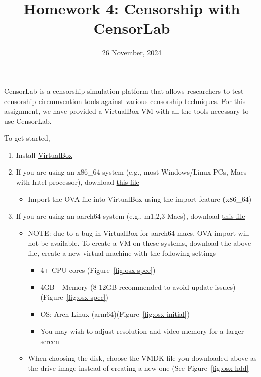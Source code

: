 \documentclass[12pt]{article}
\begin{document}
 
 
\title{Homework 4: Censorship with CensorLab}
\date{26 November, 2024}
\maketitle

CensorLab is a censorship simulation platform that allows researchers to test censorship circumvention tools against various censorship techniques. For this assignment, we have provided a VirtualBox VM with all the tools necessary to use CensorLab.


To get started,
\begin{enumerate}
    \item Install \href{https://www.virtualbox.org/wiki/Downloads}{VirtualBox}
    \item If you are using an x86\_64 system (e.g., most Windows/Linux PCs, Macs with Intel processor), download \href{https://voyager.cs.umass.edu/vm-images/censorlab.ova}{this file}
    \begin{itemize}
        \item Import the OVA file into VirtualBox using the import feature (x86\_64)
    \end{itemize}
    \item If you are using an aarch64 system (e.g., m1,2,3 Macs), download \href{https://voyager.cs.umass.edu/vm-images/censorlab-arm.vmdk}{this file}
    \begin{itemize}
        \item NOTE: due to a bug in VirtualBox for aarch64 macs, OVA import will not be available. To create a VM on these systems, download the above file, create a new virtual machine with the following settings
        \begin{itemize}
            \item 4+ CPU cores (Figure~\ref{fig:osx-spec})
            \item 4GB+ Memory (8-12GB recommended to avoid update issues)(Figure~\ref{fig:osx-spec})
            \item OS: Arch Linux (arm64)(Figure~\ref{fig:osx-initial})
            \item You may wish to adjust resolution and video memory for a larger screen
        \end{itemize}
        \item When choosing the disk, choose the VMDK file you downloaded above as the drive image instead of creating a new one (See Figure~\ref{fig:osx-hdd}

\end{itemize}
\end{enumerate}
\end{document}
